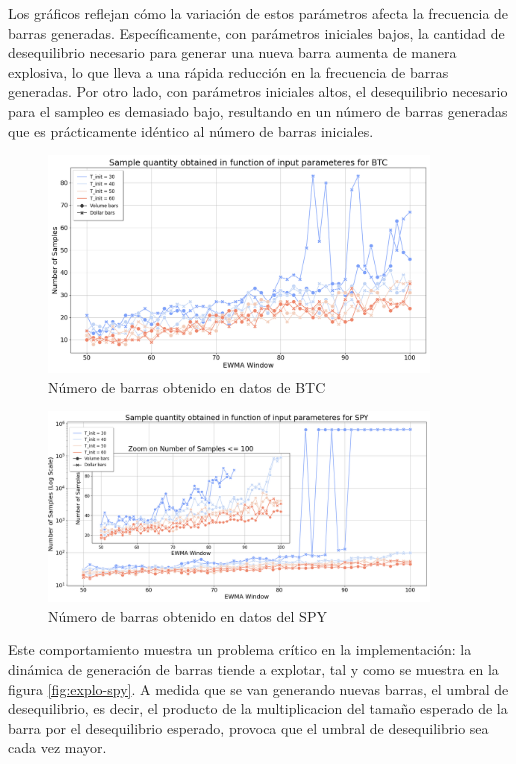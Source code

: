 \documentclass[a4paper,12pt, twoside]{report}
\begin{document}
Los gráficos reflejan cómo la variación de estos parámetros afecta la frecuencia de barras 
generadas. Específicamente, con parámetros iniciales bajos, la cantidad de desequilibrio necesario para generar una 
nueva barra aumenta de manera explosiva, lo que lleva a una rápida reducción en la frecuencia de barras generadas. 
Por otro lado, con parámetros iniciales altos, el desequilibrio necesario para el sampleo es demasiado bajo, 
resultando en un número de barras generadas que es prácticamente idéntico al número de barras iniciales. 


\begin{figure}[H]
    \centering
    \includegraphics[width=0.9\textwidth]{./figures/barrido_parametros_imbalance_btc.png}
    \caption{Número de barras obtenido en datos de BTC}
    \label{fig:barrido-btc}
\end{figure}

\begin{figure}[H]
    \centering
    \includegraphics[width=0.9\textwidth]{./figures/barrido_parametros_imbalance_spy.png}
    \caption{Número de barras obtenido en datos del SPY}
    \label{fig:barrido-spy}
\end{figure}

Este comportamiento muestra un problema crítico en la implementación: la dinámica de generación de barras tiende a explotar, 
tal y como se muestra en la figura \ref{fig:explo-spy}. A medida que se van generando nuevas barras, el umbral de desequilibrio,
es decir, el producto de la multiplicacion del tamaño esperado de la barra por el desequilibrio esperado, provoca que el umbral de
desequilibrio sea cada vez mayor.
\end{document}
